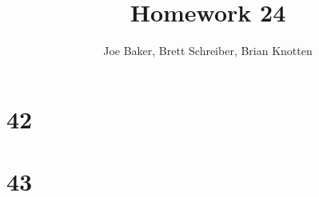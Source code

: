 \documentclass[letterpaper,notitlepage,twoside]{article}
\begin{document}
\title{Homework 24}
\author{Joe Baker, Brett Schreiber, Brian Knotten}
\maketitle
\section*{42}

\section*{43}
\end{document}
